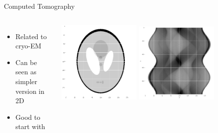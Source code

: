\documentclass[aspectratio=169]{beamer}
\begin{document}
\begin{frame}[c]{Computed Tomography}
    \begin{columns}[c]
            \begin{itemize}
                \item Related to cryo-EM
                \item Can be seen as simpler version in 2D
                \item Good to start with
            \end{itemize}
        
            \includegraphics[width=0.4\textwidth]{phantom.png}
            \includegraphics[width=0.4\textwidth]{phantom_sinogram.png}
                
        
    \end{columns}

\end{frame}

% 
%     
\end{document}
